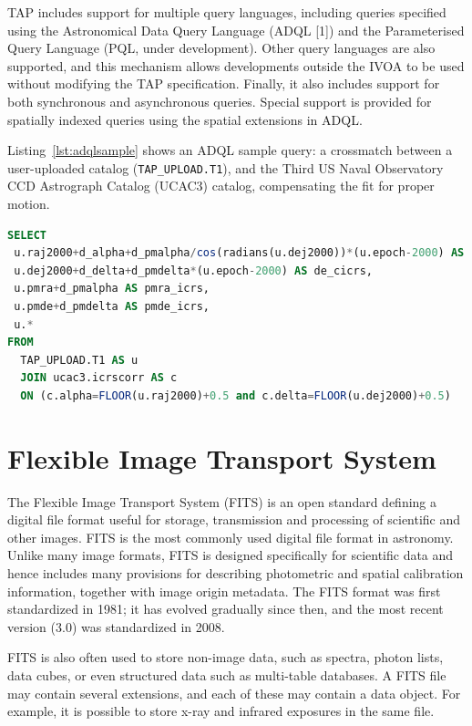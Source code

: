 TAP includes support for multiple query languages, including queries specified using the Astronomical Data Query Language (ADQL [1]) and the Parameterised Query Language (PQL, under development). Other query languages are also supported, and this mechanism allows developments outside the IVOA to be used without modifying the TAP specification. Finally, it also includes support for both synchronous and asynchronous queries. Special support is provided for spatially indexed queries using the spatial extensions in ADQL. 

Listing~\ref{lst:adqlsample} shows an ADQL sample query: a crossmatch between a user-uploaded catalog (\texttt{TAP\_UPLOAD.T1}), and
the Third US Naval Observatory CCD Astrograph Catalog (UCAC3) %
catalog, compensating the fit for proper motion.

\begin{lstlisting}[float,language=SQL,caption={ADQL sample query: the results will be a crossmatch between a user-uploaded catalog, and the UCAC3 catalog, compensating the fit for proper motion.},label=lst:adqlsample]
SELECT 
 u.raj2000+d_alpha+d_pmalpha/cos(radians(u.dej2000))*(u.epoch-2000) AS ra_icrs,
 u.dej2000+d_delta+d_pmdelta*(u.epoch-2000) AS de_cicrs,
 u.pmra+d_pmalpha AS pmra_icrs,
 u.pmde+d_pmdelta AS pmde_icrs,
 u.*
FROM
  TAP_UPLOAD.T1 AS u
  JOIN ucac3.icrscorr AS c
  ON (c.alpha=FLOOR(u.raj2000)+0.5 and c.delta=FLOOR(u.dej2000)+0.5)
\end{lstlisting}


\section{Flexible Image Transport System}

The
Flexible Image Transport System (FITS) is an open standard defining a digital file format useful for storage, transmission and processing of scientific and other images. FITS is the most commonly used digital file format in astronomy. Unlike many image formats, FITS is designed specifically for scientific data and hence includes many provisions for describing photometric and spatial calibration information, together with image origin metadata. The FITS format was first standardized in 1981; it has evolved gradually since then, and the most recent version (3.0) was standardized in 2008. 
  
FITS is also often used to store non-image data, such as spectra, photon lists, data cubes, or even structured data such as multi-table databases. A FITS file may contain several extensions, and each of these may contain a data object. For example, it is possible to store x-ray and infrared exposures in the same file. 
 
